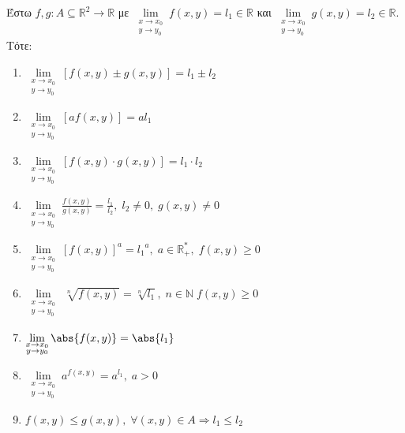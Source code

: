 \documentclass[a4paper,11pt]{report}
\begin{document}
  \begin{mybox2}
    \begin{thm}
      Έστω $ f,g \colon A \subseteq \mathbb{R}^{2} \to \mathbb{R} $ με 
      $ \lim\limits_{\substack{x\to x_{0} \\y \to y_{0}}}  f(x,y) = l_{1} \in \mathbb{R} $ 
      και 
      $ \lim\limits_{\substack{x\to x_{0} \\y \to y_{0}}} g(x,y) = l_{2} \in \mathbb{R} $. 
      Τότε:

      \begin{minipage}[t]{0.5\textwidth}
        \begin{enumerate}
          \item $ \lim\limits_{\substack{x\to x_{0} \\y \to y_{0}}}  [f(x,y)\pm g(x,y)] = 
            l_{1}\pm l_{2} $ 
          \item $ \lim\limits_{\substack{x\to x_{0} \\y \to y_{0}}}  [a f(x,y)] = al_{1} $
          \item $ \lim\limits_{\substack{x\to x_{0} \\y \to y_{0}}}  [f(x,y)\cdot g(x,y)] = 
            l_{1}\cdot l_{2} $
          \item $ \lim\limits_{\substack{x\to x_{0} \\y \to y_{0}}}  \frac{f(x,y)}{g(x,y)} = 
            \frac{l_{1}}{l_{2}}, \; l_{2} \neq 0, \; g(x,y) \neq 0 $
          \item $ \lim\limits_{\substack{x\to x_{0} \\y \to y_{0}}}  [f(x,y)]^{a} = 
            {l_{1}}^{a}, \; a \in \mathbb{R}^{*}_{+}, \; f(x,y) \geq 0 $
          \item $ \lim\limits_{\substack{x\to x_{0} \\y \to y_{0}}}  \ \sqrt[n]{f(x,y)} =
            \sqrt[n]{l_{1}}, \; n \in \mathbb{N} \; f(x,y) \geq 0  $
        \end{enumerate}
      \end{minipage} \hfill 
      \begin{minipage}[t]{0.49\textwidth}
        \begin{enumerate}
          \setcounter{enumi}{6}
          \item $ \lim\limits_{\substack{x\to x_{0} \\y \to y_{0}}}  \abs{f(x,y)} = 
            \abs{l_{1}} $ 
          \item $ \lim\limits_{\substack{x\to x_{0} \\y \to y_{0}}} a^{f(x,y)} = 
            a^{l_{1}}, \; a >0 $
          \item $ f(x,y) \leq g(x,y), \; \forall (x,y) \in A \Rightarrow l_{1} \leq l_{2} $
        \end{enumerate}
      \end{minipage}
    \end{thm}
  \end{mybox2}
\end{document}
